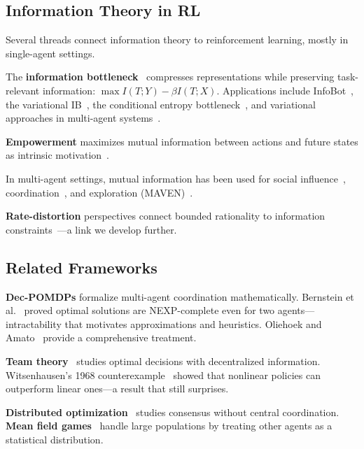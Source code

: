 \documentclass[10pt, letterpaper]{article}
\begin{document}
\subsection{Information Theory in RL}

Several threads connect information theory to reinforcement learning, mostly in single-agent settings.

The \textbf{information bottleneck}~\cite{tishby2015deep} compresses representations while preserving task-relevant information: $\max I(T;Y) - \beta I(T;X)$. Applications include InfoBot~\cite{goyal2019infobot}, the variational IB~\cite{alemi2017vib}, the conditional entropy bottleneck~\cite{fischer2020ceb}, and variational approaches in multi-agent systems~\cite{igl2019deepvariational}.

\textbf{Empowerment} maximizes mutual information between actions and future states as intrinsic motivation~\cite{klyubin2005,mohamed2015empowerment,eysenbach2018diayn}.

In multi-agent settings, mutual information has been used for social influence~\cite{jaques2019social}, coordination~\cite{wang2020roma}, and exploration (MAVEN)~\cite{mahajan2019maven}.

\textbf{Rate-distortion} perspectives connect bounded rationality to information constraints~\cite{ortega2013,genewein2015}---a link we develop further.

\subsection{Related Frameworks}

\textbf{Dec-POMDPs} formalize multi-agent coordination mathematically. Bernstein et al.~\cite{bernstein2002} proved optimal solutions are NEXP-complete even for two agents---intractability that motivates approximations and heuristics. Oliehoek and Amato~\cite{oliehoek2016} provide a comprehensive treatment.

\textbf{Team theory}~\cite{marschak1972} studies optimal decisions with decentralized information. Witsenhausen's 1968 counterexample~\cite{witsenhausen1968} showed that nonlinear policies can outperform linear ones---a result that still surprises.

\textbf{Distributed optimization}~\cite{boyd2011admm,nedic2009distributed} studies consensus without central coordination. \textbf{Mean field games}~\cite{huang2006meanfield} handle large populations by treating other agents as a statistical distribution.
\end{document}
